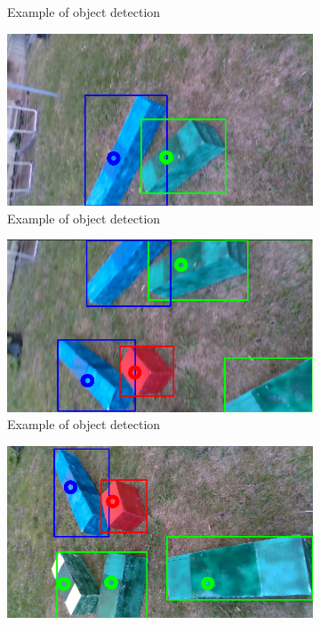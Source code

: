 \documentclass{ctuthesis}
\begin{document}
\begin{figure}[htbp]
\begin{subfigure}{0.475\textwidth}
         \caption{Example of object detection}
         \label{fig:f3}
     \end{subfigure}
          \hfill
     \begin{subfigure}{0.475\textwidth}
         \centering
         \includegraphics[width=\textwidth]{Fin_5.png}
         \caption{Example of object detection}
         \label{fig:f4}
     \end{subfigure}
          \hfill
     \begin{subfigure}{0.475\textwidth}
         \centering
         \includegraphics[width=\textwidth]{Fin_6.png}
         \caption{Example of object detection}
         \label{fig:f5}
     \end{subfigure}
    \hfill
     \begin{subfigure}{0.475\textwidth}
         \centering
         \includegraphics[width=\textwidth]{fused_alg_ex.png}

\end{subfigure}
\end{figure}
\end{document}
